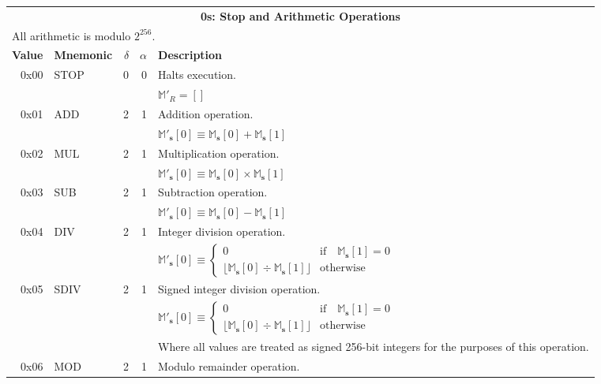 \documentclass[9pt,oneside]{amsart}
\begin{document}
\begin{tabular*}{\columnwidth}[h]{rlrrl}
\toprule
\multicolumn{5}{c}{\textbf{0s: Stop and Arithmetic Operations}} \\
\multicolumn{5}{l}{All arithmetic is modulo $2^{256}$.} \vspace{5pt} \\
\textbf{Value} & \textbf{Mnemonic} & $\delta$ & $\alpha$ & \textbf{Description} \vspace{5pt} \\
0x00 & {\small STOP} & 0 & 0 & Halts execution. \\
&&&& $\mathbb{M}'_R = []$ \\
\midrule
0x01 & {\small ADD} & 2 & 1 & Addition operation. \\
&&&& $\mathbb{M}'_\mathbf{s}[0] \equiv \mathbb{M}_\mathbf{s}[0] + \mathbb{M}_\mathbf{s}[1]$ \\
\midrule
0x02 & {\small MUL} & 2 & 1 & Multiplication operation. \\
&&&& $\mathbb{M}'_\mathbf{s}[0] \equiv \mathbb{M}_\mathbf{s}[0] \times \mathbb{M}_\mathbf{s}[1]$ \\
\midrule
0x03 & {\small SUB} & 2 & 1 & Subtraction operation. \\
&&&& $\mathbb{M}'_\mathbf{s}[0] \equiv \mathbb{M}_\mathbf{s}[0] - \mathbb{M}_\mathbf{s}[1]$ \\
\midrule
0x04 & {\small DIV} & 2 & 1 & Integer division operation. \\
&&&& $\mathbb{M}'_\mathbf{s}[0] \equiv \begin{cases}0 & \text{if} \quad \mathbb{M}_\mathbf{s}[1] = 0\\ \lfloor\mathbb{M}_\mathbf{s}[0] \div \mathbb{M}_\mathbf{s}[1]\rfloor & \text{otherwise}\end{cases}$  \\
\midrule
0x05 & {\small SDIV} & 2 & 1 & Signed integer division operation. \\
&&&& $\mathbb{M}'_\mathbf{s}[0] \equiv \begin{cases}0 & \text{if} \quad \mathbb{M}_\mathbf{s}[1] = 0\\ \lfloor\mathbb{M}_\mathbf{s}[0] \div \mathbb{M}_\mathbf{s}[1]\rfloor & \text{otherwise}\end{cases}$  \\
&&&& Where all values are treated as signed 256-bit integers for the purposes of this operation. \\
\midrule
0x06 & {\small MOD} & 2 & 1 & Modulo remainder operation. \\

\end{tabular*}
\end{document}
